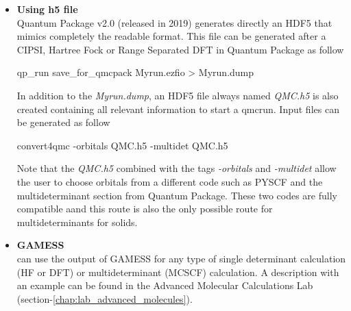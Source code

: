 \begin{itemize}
 \item \textbf{Using h5 file }\\

Quantum Package v2.0 (released in 2019) generates directly an HDF5 that mimics completely the \qmcpack readable format. This file can be generated after a CIPSI, Hartree Fock or Range Separated DFT in Quantum Package as follow \\

\begin{shade}
 qp_run save_for_qmcpack Myrun.ezfio > Myrun.dump
\end{shade}

In addition to the \textit{Myrun.dump}, an HDF5 file always named \textit{QMC.h5} is also created containing all relevant information to start a qmcrun. Input files can be generated as follow\\

\begin{shade}
 convert4qmc -orbitals QMC.h5 -multidet QMC.h5
\end{shade}

Note that the \textit{QMC.h5} combined with the tags \textit{-orbitals} and \textit{-multidet} allow the user to choose orbitals from a different code such as PYSCF and the multideterminant section from Quantum Package. These two codes are fully compatible aand this route is also the only possible route for multideterminants for solids. 

\item \textbf{GAMESS}\\
\qmcpack can use the output of GAMESS\cite{schmidt93} for any type of single determinant calculation (HF or DFT) or multideterminant (MCSCF) calculation. A description with an example can be found in the Advanced Molecular Calculations Lab (section-\ref{chap:lab_advanced_molecules}).
\end{itemize}

